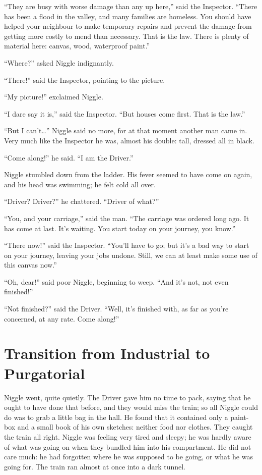 “They are busy with worse damage than any up here,” said the Inspector. “There has been a flood in the valley, and many families are homeless. You should have helped your neighbour to make temporary repairs and prevent the damage from getting more costly to mend than necessary. That is the law. There is plenty of material here: canvas, wood, waterproof paint.”

“Where?” asked Niggle indignantly.

“There!” said the Inspector, pointing to the picture.

“My picture!” exclaimed Niggle.

“I dare say it is,” said the Inspector. “But houses come first. That is the law.”

“But I can’t…” Niggle said no more, for at that moment another man came in. Very much like the Inspector he was, almost his double: tall, dressed all in black.

“Come along!” he said. “I am the Driver.”

Niggle stumbled down from the ladder. His fever seemed to have come on again, and his head was swimming; he felt cold all over.

“Driver? Driver?” he chattered. “Driver of what?”

“You, and your carriage,” said the man. “The carriage was ordered long ago. It has come at last. It’s waiting. You start today on your journey, you know.”

“There now!” said the Inspector. “You’ll have to go; but it’s a bad way to start on your journey, leaving your jobs undone. Still, we can at least make some use of this canvas now.”

“Oh, dear!” said poor Niggle, beginning to weep. “And it’s not, not even finished!”

“Not finished?” said the Driver. “Well, it’s finished with, as far as you’re concerned, at any rate. Come along!”

\section*{Transition from Industrial to Purgatorial}

Niggle went, quite quietly. The Driver gave him no time to pack, saying that he ought to have done that before, and they would miss the train; so all Niggle could do was to grab a little bag in the hall. He found that it contained only a paint-box and a small book of his own sketches: neither food nor clothes. They caught the train all right. Niggle was feeling very tired and sleepy; he was hardly aware of what was going on when they bundled him into his compartment. He did not care much: he had forgotten where he was supposed to be going, or what he was going for. The train ran almost at once into a dark tunnel.

